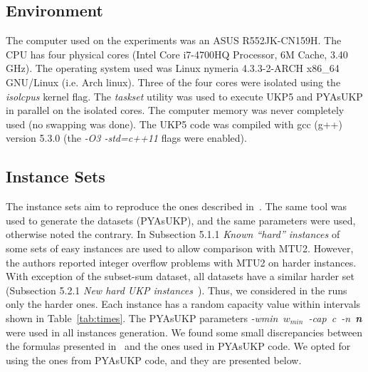\documentclass[runningheads,a4paper]{llncs}
\begin{document}
\subsection{Environment}

The computer used on the experiments was an ASUS R552JK-CN159H. The CPU has four physical cores (Intel Core i7-4700HQ Processor, 6M Cache, 3.40 GHz). 
The operating system used was Linux nymeria 4.3.3-2-ARCH x86\_64 GNU/Linux (i.e. Arch linux). 
Three of the four cores were isolated using the \emph{isolcpus} kernel flag. 
The \emph{taskset} utility was used to execute UKP5 and PYAsUKP in parallel on the isolated cores. 
The computer memory was never completely used (no swapping was done). 
The UKP5 code was compiled with gcc (g++) version 5.3.0 (the \emph{-O3 -std=c++11} flags were enabled).

\subsection{Instance Sets}

The instance sets aim to reproduce the ones described in~\cite{pya}. 
The same tool was used to generate the datasets (PYAsUKP), and the same parameters were used, otherwise noted the contrary. 
In Subsection 5.1.1 \emph{Known ``hard'' instances} of~\cite{pya} some sets of easy instances are used to allow comparison with MTU2. 
However, the authors reported integer overflow problems with  MTU2 on harder instances. 
With exception of the subset-sum dataset, all datasets have a similar harder set (Subsection 5.2.1 \emph{New hard UKP instances}~\cite{pya}).
Thus, we considered in the runs only the harder ones. 
Each instance has a random capacity value within intervals shown in Table~\ref{tab:times}. 
The PYAsUKP parameters \mbox{\emph{-wmin \(w_{min}\) -cap c -n \textbf{n}}} were used in all instances generation. 
We found some small discrepancies between the formulas presented in~\cite{pya} and the ones used in PYAsUKP code.
We opted for using the ones from  PYAsUKP code, and they are presented below.
\end{document}
